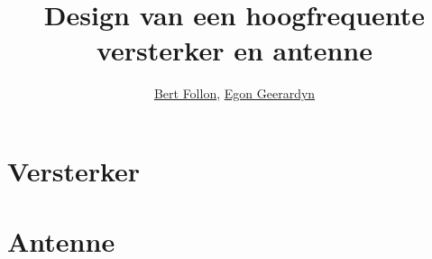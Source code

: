 \documentclass[pdftex,a4paper]{article}
\title{Design van een hoogfrequente versterker en antenne}
\author{\href{mailto:Bert.Follon@vub.ac.be}{Bert Follon},
         \href{mailto:Egon.Geerardyn@vub.ac.be}{Egon Geerardyn}}
\date{\datum}
\begin{document}
  \maketitlepage
  \newpage
  \tableofcontents
  \listoffigures
  \listoftables
  \newpage
  \part{Versterker}
  \label{sec:Amp}
    
    

  \newpage
  \part{Antenne}
  \label{sec:AE}

    
    
  \newpage
  
  
  
  
\end{document}
